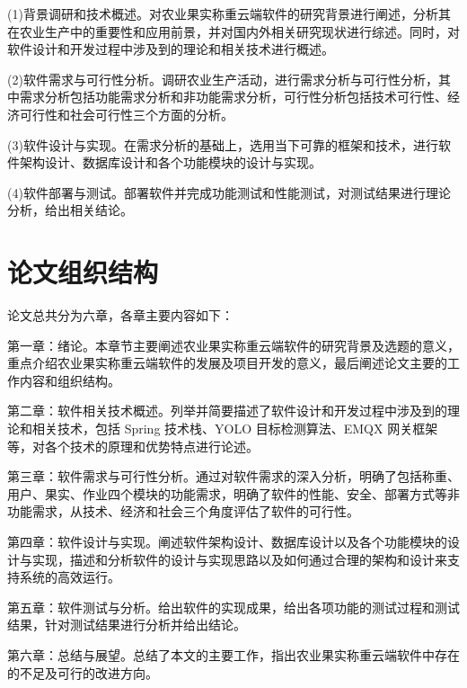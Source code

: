 (1)背景调研和技术概述。对农业果实称重云端软件的研究背景进行阐述，分析其在农业生产中的重要性和应用前景，并对国内外相关研究现状进行综述。同时，对软件设计和开发过程中涉及到的理论和相关技术进行概述。

(2)软件需求与可行性分析。调研农业生产活动，进行需求分析与可行性分析，其中需求分析包括功能需求分析和非功能需求分析，可行性分析包括技术可行性、经济可行性和社会可行性三个方面的分析。

(3)软件设计与实现。在需求分析的基础上，选用当下可靠的框架和技术，进行软件架构设计、数据库设计和各个功能模块的设计与实现。

(4)软件部署与测试。部署软件并完成功能测试和性能测试，对测试结果进行理论分析，给出相关结论。

\section{论文组织结构}

论文总共分为六章，各章主要内容如下：

第一章：绪论。本章节主要阐述农业果实称重云端软件的研究背景及选题的意义，重点介绍农业果实称重云端软件的发展及项目开发的意义，最后阐述论文主要的工作内容和组织结构。

第二章：软件相关技术概述。列举并简要描述了软件设计和开发过程中涉及到的理论和相关技术，包括 Spring 技术栈、YOLO 目标检测算法、EMQX 网关框架等，对各个技术的原理和优势特点进行论述。

第三章：软件需求与可行性分析。通过对软件需求的深入分析，明确了包括称重、用户、果实、作业四个模块的功能需求，明确了软件的性能、安全、部署方式等非功能需求，从技术、经济和社会三个角度评估了软件的可行性。

第四章：软件设计与实现。阐述软件架构设计、数据库设计以及各个功能模块的设计与实现，描述和分析软件的设计与实现思路以及如何通过合理的架构和设计来支持系统的高效运行。

第五章：软件测试与分析。给出软件的实现成果，给出各项功能的测试过程和测试结果，针对测试结果进行分析并给出结论。

第六章：总结与展望。总结了本文的主要工作，指出农业果实称重云端软件中存在的不足及可行的改进方向。
